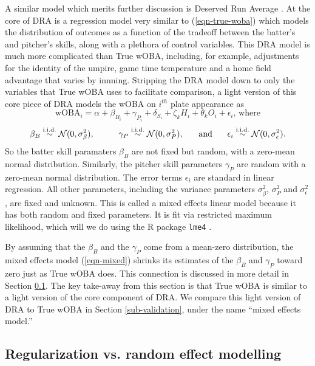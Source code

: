 \documentclass[11pt]{article}
\def\iid{\stackrel{\mbox{\scriptsize i.i.d.}}{\sim}}
\begin{document}
A similar model which merits further discussion is Deserved Run Average
\citep[DRA]{Judge15}. At the core of DRA is a
regression model very similar to (\ref{eqn-true-woba}) which models the
distribution of outcomes as a function of the tradeoff between the batter's and
pitcher's skills, along with a plethora of control variables. This DRA model is
much more complicated than True wOBA, including, for example, adjustments for
the
identity of the umpire, game time temperature and a home field advantage that
varies by innning. Stripping the DRA model down to only the variables that True
wOBA uses to facilitate comparison, a light version of this core piece of DRA
models the wOBA on $i^{th}$ plate appearance as
$$\mbox{wOBA}_i = \alpha + \beta_{B_i} + \gamma_{P_i} + \delta_{S_i} + \zeta_kH_i + \theta_kO_i + \epsilon_i\mbox{, where}$$
\begin{equation}
\label{eqn-mixed}
\beta_B \iid \N(0, \sigma^2_\beta),\hspace{1cm}
    \gamma_P \iid \N(0, \sigma^2_P),\hspace{.5cm}\mbox{ and }\hspace{.5cm}
    \epsilon_i \iid \N(0, \sigma^2_\epsilon).
\end{equation}
So the batter skill paramaters $\beta_B$ are not fixed but random, with a
zero-mean normal distribution. Similarly, the pitcher skill parameters
$\gamma_P$ are random with a zero-mean normal distribution. The error terms
$\epsilon_i$ are standard in linear regression. All other parameters, including
the variance parameters $\sigma^2_\beta$, $\sigma^2_P$ and $\sigma^2_\epsilon$,
are fixed and unknown. This is called a mixed effects linear model because it
has both random and fixed parameters. It is fit via restricted maximum
likelihood, which will we do using the R package {\tt lme4} \cite{lme4}.

By assuming that the $\beta_B$ and the $\gamma_P$ come from a mean-zero
distribution, the mixed effects model (\ref{eqn-mixed}) shrinks its estimates
of the $\beta_B$ and $\gamma_P$ toward zero just as True wOBA does. This
connection is discussed in more detail in Section \ref{sub-regul-vs-rando}. The
key take-away from this section is that True wOBA is similar to a light version
of the core component of DRA. We compare this light version of DRA to True wOBA
in Section \ref{sub-validation}, under the name ``mixed effects model.''

\subsection{Regularization vs. random effect modelling}
\label{sub-regul-vs-rando}
\end{document}
